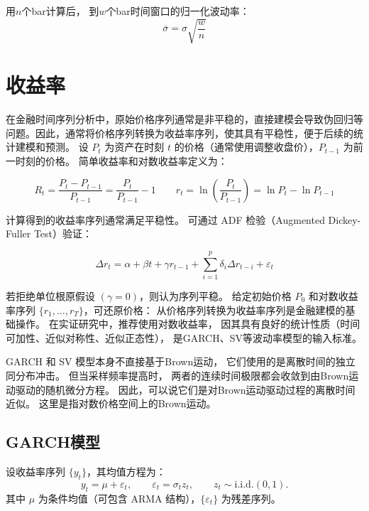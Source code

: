 \documentclass[a4paper,10pt]{article}
\begin{document}
用$n$个bar计算后，
到$w$个bar时间窗口的归一化波动率：
\begin{equation}
\overline \sigma = \sigma \sqrt{\frac{w}{n}}
\end{equation}

\section{收益率}

在金融时间序列分析中，原始价格序列通常是非平稳的，直接建模会导致伪回归等问题。因此，通常将价格序列转换为收益率序列，使其具有平稳性，便于后续的统计建模和预测。
设 $P_t$ 为资产在时刻 $t$ 的价格（通常使用调整收盘价），$P_{t-1}$ 为前一时刻的价格。
简单收益率和对数收益率定义为：

\begin{equation}
    R_t = \frac{P_t - P_{t-1}}{P_{t-1}} = \frac{P_t}{P_{t-1}} - 1
    \qquad
    r_t = \ln\left(\frac{P_t}{P_{t-1}}\right) = \ln P_t - \ln P_{t-1}
    \label{eq:log_return}
\end{equation}

计算得到的收益率序列通常满足平稳性。
可通过 ADF 检验（Augmented Dickey-Fuller Test）验证：

\begin{equation}
    \Delta r_t = \alpha + \beta t + \gamma r_{t-1} + \sum_{i=1}^{p} \delta_i \Delta r_{t-i} + \varepsilon_t
\end{equation}

若拒绝单位根原假设 $(\gamma = 0)$，则认为序列平稳。
给定初始价格 $P_0$ 和对数收益率序列 $\{r_1, \dots, r_T\}$，可还原价格：
从价格序列转换为收益率序列是金融建模的基础操作。
在实证研究中，推荐使用对数收益率，
因其具有良好的统计性质（时间可加性、近似对称性、近似正态性），
是GARCH、SV等波动率模型的输入标准。

GARCH 和 SV 模型本身不直接基于Brown运动，
它们使用的是离散时间的独立同分布冲击。
但当采样频率提高时，
两者的连续时间极限都会收敛到由Brown运动驱动的随机微分方程。
因此，可以说它们是对Brown运动驱动过程的离散时间近似。
这里是指对数价格空间上的Brown运动。

\subsection{GARCH模型}

设收益率序列 $\{y_t\}$，其均值方程为：
\begin{equation}
    y_t = \mu + \varepsilon_t, \qquad \varepsilon_t = \sigma_t z_t, \qquad z_t \sim \text{i.i.d.}(0,1).
\end{equation}
其中 $\mu$ 为条件均值（可包含 ARMA 结构），$\{\varepsilon_t\}$ 为残差序列。
\end{document}

